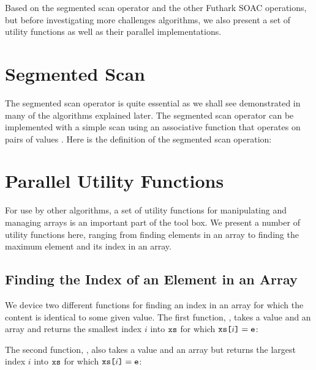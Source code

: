 \documentclass[oneside,11pt]{book}
\newenvironment{wrap}{\vspace{\topskip}\par\noindent\begin{minipage}{\linewidth}}{\end{minipage}\par}
\begin{document}
Based on the segmented scan operator and the other Futhark SOAC
operations, but before investigating more challenges algorithms, we
also present a set of utility functions as well as their parallel
implementations.

\section{Segmented Scan}
\label{sec:sgmscan}

The segmented scan operator is quite essential as we shall see
demonstrated in many of the algorithms explained later. The segmented
scan operator can be implemented with a simple scan using an
associative function that operates on pairs of values
\cite{Schwartz:1980:ULT:357114.357116,blelloch1990vector}. Here is the
definition of the segmented scan operation:

\begin{wrap}

\end{wrap}

\section{Parallel Utility Functions}
For use by other algorithms, a set of utility functions for
manipulating and managing arrays is an important part of the tool
box. We present a number of utility functions here, ranging from
finding elements in an array to finding the maximum element and its
index in an array.

\subsection{Finding the Index of an Element in an Array}
We device two different functions for finding an index in an array for
which the content is identical to some given value. The first function,
, takes a value  and an array  and
returns the smallest index $i$ into $\texttt{xs}$ for which $\texttt{xs[}i\texttt{]} =
\texttt{e}$:

\begin{wrap}

\end{wrap}

The second function,
, also takes a value  and an array  but
returns the largest index $i$ into $\texttt{xs}$ for which $\texttt{xs[}i\texttt{]} =
\texttt{e}$:
\end{document}
